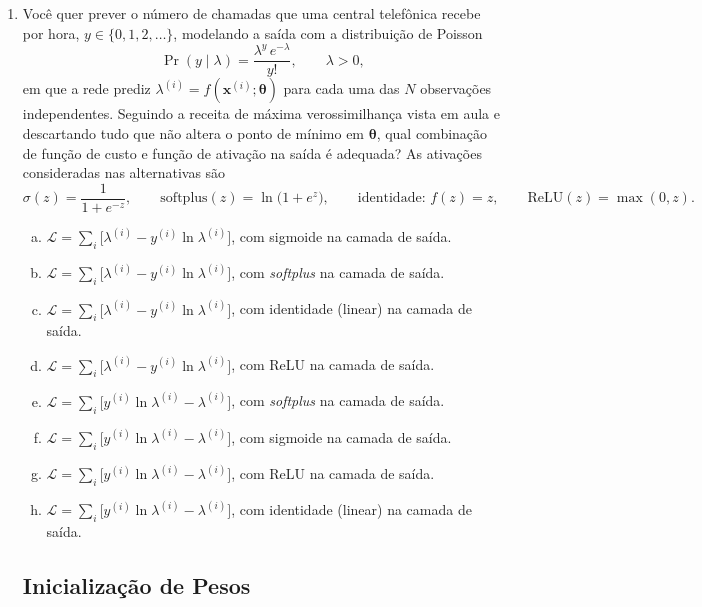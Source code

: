 \documentclass{dlproblemset}
\begin{document}
\begin{enumerate}[1)]
    \item Você quer prever o número de chamadas que uma central telefônica recebe por hora, $y \in \{0, 1, 2, \ldots\}$, modelando a saída com a distribuição de Poisson
    \[
    \Pr(y \mid \lambda) = \frac{\lambda^{y}\,e^{-\lambda}}{y!}, \qquad \lambda > 0 ,
    \]
    em que a rede prediz $\lambda^{(i)} = f(\mathbf{x}^{(i)}; \boldsymbol{\theta})$ para cada uma das $N$ observações independentes. Seguindo a receita de máxima verossimilhança vista em aula e descartando tudo que não altera o ponto de mínimo em $\boldsymbol{\theta}$, qual combinação de função de custo e função de ativação na saída é adequada? As ativações consideradas nas alternativas são
    \[
    \sigma(z) = \frac{1}{1 + e^{-z}}, \qquad
    \mathrm{softplus}(z) = \ln\bigl(1 + e^{z}\bigr), \qquad
    \text{identidade: } f(z) = z, \qquad
    \mathrm{ReLU}(z) = \max(0, z).
    \]

    \begin{enumerate}[(a)]
        \item $\mathcal{L} = \sum_{i}\bigl[\lambda^{(i)} - y^{(i)}\ln\lambda^{(i)}\bigr]$, com sigmoide na camada de saída.
        \item $\mathcal{L} = \sum_{i}\bigl[\lambda^{(i)} - y^{(i)}\ln\lambda^{(i)}\bigr]$, com \textit{softplus} na camada de saída.
        \item $\mathcal{L} = \sum_{i}\bigl[\lambda^{(i)} - y^{(i)}\ln\lambda^{(i)}\bigr]$, com identidade (linear) na camada de saída.
        \item $\mathcal{L} = \sum_{i}\bigl[\lambda^{(i)} - y^{(i)}\ln\lambda^{(i)}\bigr]$, com ReLU na camada de saída.
        \item $\mathcal{L} = \sum_{i}\bigl[y^{(i)}\ln\lambda^{(i)} - \lambda^{(i)}\bigr]$, com \textit{softplus} na camada de saída.
        \item $\mathcal{L} = \sum_{i}\bigl[y^{(i)}\ln\lambda^{(i)} - \lambda^{(i)}\bigr]$, com sigmoide na camada de saída.
        \item $\mathcal{L} = \sum_{i}\bigl[y^{(i)}\ln\lambda^{(i)} - \lambda^{(i)}\bigr]$, com ReLU na camada de saída.
        \item $\mathcal{L} = \sum_{i}\bigl[y^{(i)}\ln\lambda^{(i)} - \lambda^{(i)}\bigr]$, com identidade (linear) na camada de saída.
    \end{enumerate}

\subsection*{Inicialização de Pesos}


\end{enumerate}
\end{document}
